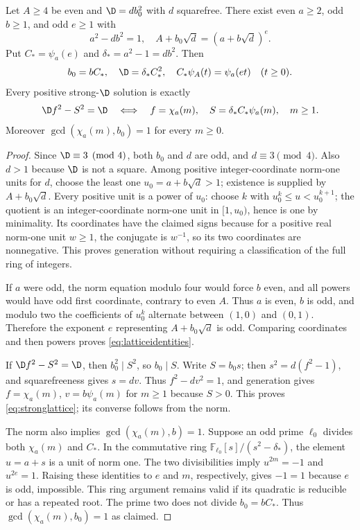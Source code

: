 \begin{lemma}\label{lem:lattice}
Let $A\ge4$ be even and $\D=d b_0^2$ with $d$ squarefree.
There exist even $a\ge2$, odd $b\ge1$, and odd $e\ge1$ with
\[
 a^2-db^2=1,\quad
 A+b_0\sqrt d=(a+b\sqrt d)^e.
\]
Put $C_*=\psi_a(e)$ and $\delta_*=a^2-1=db^2$. Then
\begin{equation}\label{eq:latticeidentities}
 b_0=bC_*,\quad \D=\delta_*C_*^2,\quad
 C_*\psi_A(t)=\psi_a(et)\quad(t\ge0).
\end{equation}
Every positive strong-$\D$ solution is exactly
\begin{equation}\label{eq:stronglattice}
 \D f^2-S^2=\D
 \quad\Longleftrightarrow\quad
 f=\chi_a(m),\quad S=\delta_*C_*\psi_a(m),\quad m\ge1.
\end{equation}
Moreover $\gcd(\chi_a(m),b_0)=1$ for every $m\ge0$.
\end{lemma}
\begin{proof}
Since $\D\equiv3\pmod4$, both $b_0$ and $d$ are odd, and
$d\equiv3\pmod4$. Also $d>1$ because $\D$ is not a square.
Among positive integer-coordinate norm-one units for $d$, choose
the least one $u_0=a+b\sqrt d>1$; existence is supplied by
$A+b_0\sqrt d$. Every positive unit is a power of $u_0$:
choose $k$ with $u_0^k\le u<u_0^{k+1}$; the quotient is an
integer-coordinate norm-one unit in $[1,u_0)$, hence is one by
minimality. Its coordinates have the claimed signs because for a
positive real norm-one unit $w\ge1$, the conjugate is $w^{-1}$,
so its two coordinates are nonnegative. This proves generation
without requiring a classification of the full ring of integers.

If $a$ were odd, the norm equation modulo four would force $b$ even,
and all powers would have odd first coordinate, contrary to even $A$.
Thus $a$ is even, $b$ is odd, and modulo two the coefficients of
$u_0^k$ alternate between $(1,0)$ and $(0,1)$. Therefore the exponent
$e$ representing $A+b_0\sqrt d$ is odd. Comparing coordinates and
then powers proves \eqref{eq:latticeidentities}.

If $\D f^2-S^2=\D$, then $b_0^2\mid S^2$, so $b_0\mid S$.
Write $S=b_0s$; then $s^2=d(f^2-1)$, and squarefreeness gives
$s=dv$. Thus $f^2-dv^2=1$, and generation gives
$f=\chi_a(m)$, $v=b\psi_a(m)$ for $m\ge1$ because $S>0$.
This proves \eqref{eq:stronglattice}; its converse follows from the norm.

The norm also implies $\gcd(\chi_a(m),b)=1$. Suppose an odd prime
$\ell_0$ divides both $\chi_a(m)$ and $C_*$.
In the commutative ring
$\mathbb F_{\ell_0}[s]/(s^2-\delta_*)$, the element $u=a+s$
is a unit of norm one. The two divisibilities imply
$u^{2m}=-1$ and $u^{2e}=1$. Raising these identities to $e$ and
$m$, respectively, gives $-1=1$ because $e$ is odd, impossible.
This ring argument remains valid if its quadratic is reducible or has
a repeated root. The prime two does not divide $b_0=bC_*$.
Thus $\gcd(\chi_a(m),b_0)=1$ as claimed.
\end{proof}

